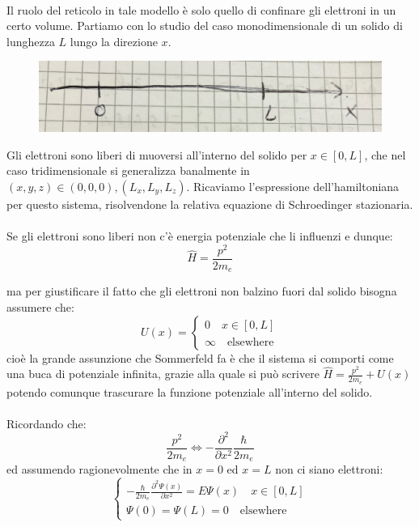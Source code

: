 \documentclass{book}
\begin{document}
        \paragraph{}
            Il ruolo del reticolo in tale modello è solo quello di confinare gli elettroni in un certo volume. Partiamo con lo studio del caso monodimensionale di un solido di lunghezza $L$ lungo la direzione $x$.
            \begin{figure}[h!]
                \centering
                \includegraphics[width=0.5\linewidth]{img/direzioneLungoExLez12.png}
            \end{figure}
            Gli elettroni sono liberi di muoversi all'interno del solido per $x \in [0,L]$, che nel caso tridimensionale si generalizza banalmente in $(x,y,z) \in (0,0,0),(L_{x}, L_{y}, L_{z})$. Ricaviamo l'espressione dell'hamiltoniana  per questo sistema, risolvendone la relativa equazione di Schroedinger stazionaria.
        \paragraph{}
            Se gli elettroni sono liberi non c'è energia potenziale che li influenzi e dunque:
            $$\hat{H} = \frac{p^{2}}{2m_{e}}$$

            ma per giustificare il fatto che gli elettroni non balzino fuori dal solido bisogna assumere che:
            $$U(x) =\begin{cases}
                0 \quad x \in [0, L] \\
                \infty \quad \textrm{elsewhere}
            \end{cases}$$
            cioè la grande assunzione che Sommerfeld fa è che il sistema si comporti come una buca di potenziale infinita, grazie alla quale si può scrivere $\hat{H} = \frac{p^{2}}{2m_{e}}+ U(x)$ potendo comunque trascurare la funzione potenziale all'interno del solido.
            \paragraph{} Ricordando che:
            $$\frac{p^{2}}{2m_{e}} \iff - \frac{\partial ^{2}}{\partial x^{2}} \frac{\hbar}{2m_{e}}$$
            ed assumendo ragionevolmente che in $x=0$ ed $x=L$ non ci siano elettroni:
            $$\begin{cases}
                \displaystyle -\frac{\hbar}{2m_{e}}\frac{\partial ^{2} \Psi(x)}{\partial x^{2}} = E\Psi(x)  \quad x \in [0,L]\\
                \Psi(0) = \Psi(L) = 0 \quad \textrm{elsewhere}
            \end{cases}$$
\end{document}
